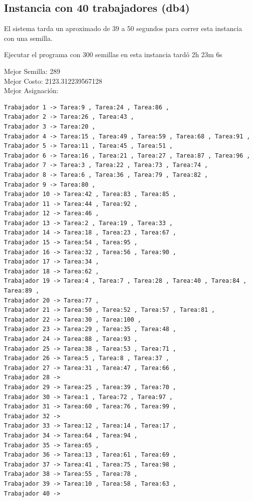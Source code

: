 \documentclass{article}
\begin{document}
\subsection{Instancia con 40 trabajadores (db4)}
El sistema tarda un aproximado de 39 a 50 segundos para correr esta instancia con una semilla.

Ejecutar el programa con 300 semillas en esta instancia tardó 2h 23m 6s
 
Mejor Semilla: 289\\
Mejor Costo: 2123.312239567128\\
Mejor Asignación: 
\begin{lstlisting}
Trabajador 1 -> Tarea:9 , Tarea:24 , Tarea:86 , 
Trabajador 2 -> Tarea:26 , Tarea:43 , 
Trabajador 3 -> Tarea:20 , 
Trabajador 4 -> Tarea:15 , Tarea:49 , Tarea:59 , Tarea:68 , Tarea:91 , 
Trabajador 5 -> Tarea:11 , Tarea:45 , Tarea:51 , 
Trabajador 6 -> Tarea:16 , Tarea:21 , Tarea:27 , Tarea:87 , Tarea:96 , 
Trabajador 7 -> Tarea:3 , Tarea:22 , Tarea:73 , Tarea:74 , 
Trabajador 8 -> Tarea:6 , Tarea:36 , Tarea:79 , Tarea:82 , 
Trabajador 9 -> Tarea:80 , 
Trabajador 10 -> Tarea:42 , Tarea:83 , Tarea:85 , 
Trabajador 11 -> Tarea:44 , Tarea:92 , 
Trabajador 12 -> Tarea:46 , 
Trabajador 13 -> Tarea:2 , Tarea:19 , Tarea:33 , 
Trabajador 14 -> Tarea:18 , Tarea:23 , Tarea:67 , 
Trabajador 15 -> Tarea:54 , Tarea:95 , 
Trabajador 16 -> Tarea:32 , Tarea:56 , Tarea:90 , 
Trabajador 17 -> Tarea:34 , 
Trabajador 18 -> Tarea:62 , 
Trabajador 19 -> Tarea:4 , Tarea:7 , Tarea:28 , Tarea:40 , Tarea:84 , Tarea:89 , 
Trabajador 20 -> Tarea:77 , 
Trabajador 21 -> Tarea:50 , Tarea:52 , Tarea:57 , Tarea:81 , 
Trabajador 22 -> Tarea:30 , Tarea:100 , 
Trabajador 23 -> Tarea:29 , Tarea:35 , Tarea:48 , 
Trabajador 24 -> Tarea:88 , Tarea:93 , 
Trabajador 25 -> Tarea:38 , Tarea:53 , Tarea:71 , 
Trabajador 26 -> Tarea:5 , Tarea:8 , Tarea:37 , 
Trabajador 27 -> Tarea:31 , Tarea:47 , Tarea:66 , 
Trabajador 28 -> 
Trabajador 29 -> Tarea:25 , Tarea:39 , Tarea:70 , 
Trabajador 30 -> Tarea:1 , Tarea:72 , Tarea:97 , 
Trabajador 31 -> Tarea:60 , Tarea:76 , Tarea:99 , 
Trabajador 32 -> 
Trabajador 33 -> Tarea:12 , Tarea:14 , Tarea:17 , 
Trabajador 34 -> Tarea:64 , Tarea:94 , 
Trabajador 35 -> Tarea:65 , 
Trabajador 36 -> Tarea:13 , Tarea:61 , Tarea:69 , 
Trabajador 37 -> Tarea:41 , Tarea:75 , Tarea:98 , 
Trabajador 38 -> Tarea:55 , Tarea:78 , 
Trabajador 39 -> Tarea:10 , Tarea:58 , Tarea:63 , 
Trabajador 40 -> 
\end{lstlisting}
\end{document}
